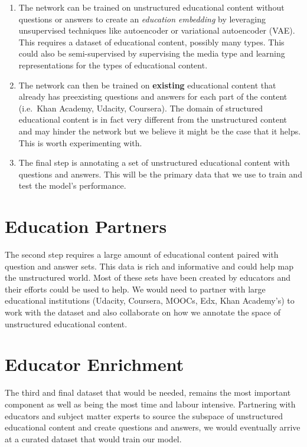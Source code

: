 \documentclass[]{book}
\theoremstyle{definition}
\theoremstyle{definition}
\theoremstyle{definition}
\theoremstyle{remark}
\begin{document}
\begin{enumerate}
\def\labelenumi{\arabic{enumi}.}
\item
  The network can be trained on unstructured educational content without
  questions or answers to create an \emph{education embedding} by
  leveraging unsupervised techniques like autoencoder or variational
  autoencoder (VAE). This requires a dataset of educational content,
  possibly many types. This could also be semi-supervised by supervising
  the media type and learning representations for the types of
  educational content.
\item
  The network can then be trained on \textbf{existing} educational
  content that already has preexisting questions and answers for each
  part of the content (i.e.~Khan Academy, Udacity, Coursera). The domain
  of structured educational content is in fact very different from the
  unstructured content and may hinder the network but we believe it
  might be the case that it helps. This is worth experimenting with.
\item
  The final step is annotating a set of unstructured educational content
  with questions and answers. This will be the primary data that we use
  to train and test the model's performance.
\end{enumerate}

\section{Education Partners}\label{education-partners}

The second step requires a large amount of educational content paired
with question and answer sets. This data is rich and informative and
could help map the unstructured world. Most of these sets have been
created by educators and their efforts could be used to help. We would
need to partner with large educational institutions (Udacity, Coursera,
MOOCs, Edx, Khan Academy's) to work with the dataset and also
collaborate on how we annotate the space of unstructured educational
content.

\section{Educator Enrichment}\label{educator-enrichment}

The third and final dataset that would be needed, remains the most
important component as well as being the most time and labour intensive.
Partnering with educators and subject matter experts to source the
subspace of unstructured educational content and create questions and
answers, we would eventually arrive at a curated dataset that would
train our model.
\end{document}
